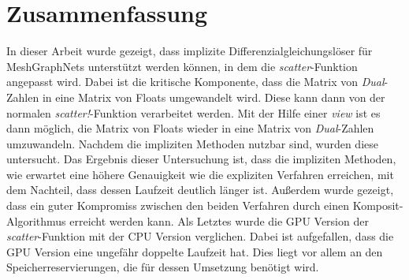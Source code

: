 
\section{Zusammenfassung}

In dieser Arbeit wurde gezeigt, dass implizite Differenzialgleichungslöser für Mesh\-Graph\-Nets 
unterstützt werden können, in dem die \textit{scatter}-Funktion angepasst wird.
Dabei ist die kritische Komponente, dass die Matrix von \textit{Dual}-Zahlen in eine Matrix von Floats umgewandelt wird.
Diese kann dann von der normalen \textit{scatter!}-Funktion verarbeitet werden.
Mit der Hilfe einer \textit{view} ist es dann möglich, die Matrix von Floats wieder in eine Matrix von \textit{Dual}-Zahlen
umzuwandeln.
Nachdem die impliziten Methoden nutzbar sind, wurden diese untersucht.
Das Ergebnis dieser Untersuchung ist, dass die impliziten Methoden, wie erwartet eine höhere Genauigkeit
wie die expliziten Verfahren erreichen, mit dem Nachteil, dass dessen Laufzeit deutlich länger ist.
Außerdem wurde gezeigt, dass ein guter Kompromiss zwischen den beiden Verfahren durch einen Komposit-Algorithmus erreicht werden kann.
Als Letztes wurde die GPU Version der \textit{scatter}-Funktion mit der CPU Version verglichen.
Dabei ist aufgefallen, dass die GPU Version eine ungefähr doppelte Laufzeit hat.
Dies liegt vor allem an den Speicherreservierungen, die für dessen Umsetzung benötigt wird.

